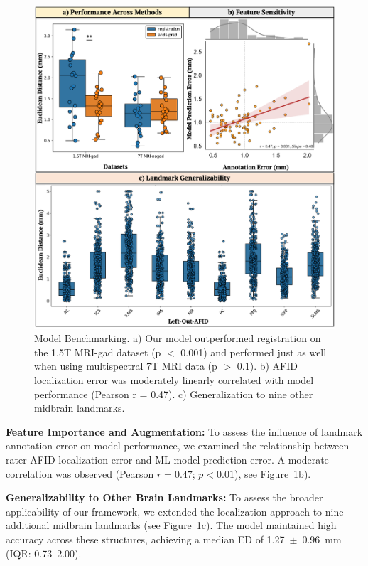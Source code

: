 \begin{figure}[hbt!]
    \centering
    \includegraphics[width=1\linewidth]{figs/ch4_Figure_bench.png}
    \caption{Model Benchmarking. a) Our model outperformed registration on the 1.5T MRI-gad dataset (p \(<\) 0.001) and performed just as well when using multispectral 7T MRI data (p \(>\) 0.1). b) AFID localization error was moderately linearly correlated with model performance (Pearson r = 0.47). c) Generalization to nine other midbrain landmarks.}
    \label{fig:ch4_Figure_bench}
\end{figure}

\textbf{Feature Importance and Augmentation:} To assess the influence of landmark annotation error on model performance, we examined the relationship between rater AFID localization error and ML model prediction error. A moderate correlation was observed (Pearson $r = 0.47$; $p < 0.01$), see Figure~\ref{fig:ch4_Figure_bench}b).

\textbf{Generalizability to Other Brain Landmarks:} To assess the broader applicability of our framework, we extended the localization approach to nine additional midbrain landmarks (see Figure~\ref{fig:ch4_Figure_bench}c). The model maintained high accuracy across these structures, achieving a median ED of 1.27~$\pm$~0.96~mm (IQR: 0.73–2.00).

